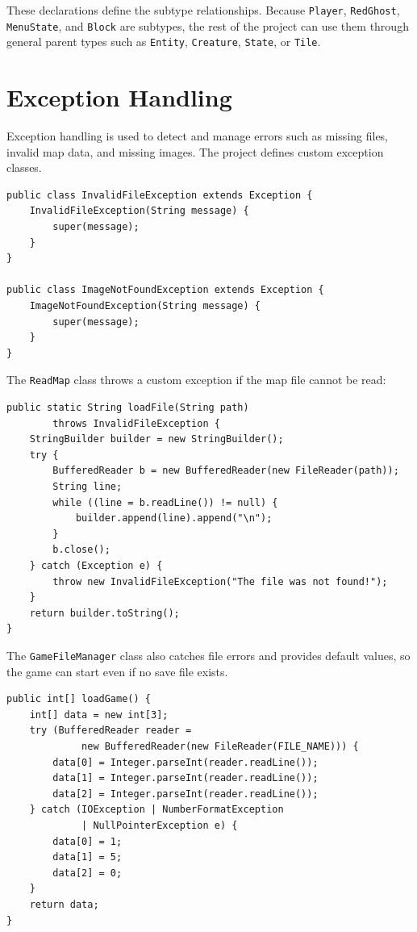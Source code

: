 \documentclass[12pt,a4paper]{article}
\begin{document}
These declarations define the subtype relationships. Because \texttt{Player}, \texttt{RedGhost}, \texttt{MenuState}, and \texttt{Block} are subtypes, the rest of the project can use them through general parent types such as \texttt{Entity}, \texttt{Creature}, \texttt{State}, or \texttt{Tile}.

\section{Exception Handling}

Exception handling is used to detect and manage errors such as missing files, invalid map data, and missing images. The project defines custom exception classes.

\begin{lstlisting}
public class InvalidFileException extends Exception {
    InvalidFileException(String message) {
        super(message);
    }
}

public class ImageNotFoundException extends Exception {
    ImageNotFoundException(String message) {
        super(message);
    }
}
\end{lstlisting}

The \texttt{ReadMap} class throws a custom exception if the map file cannot be read:

\begin{lstlisting}
public static String loadFile(String path)
        throws InvalidFileException {
    StringBuilder builder = new StringBuilder();
    try {
        BufferedReader b = new BufferedReader(new FileReader(path));
        String line;
        while ((line = b.readLine()) != null) {
            builder.append(line).append("\n");
        }
        b.close();
    } catch (Exception e) {
        throw new InvalidFileException("The file was not found!");
    }
    return builder.toString();
}
\end{lstlisting}

The \texttt{GameFileManager} class also catches file errors and provides default values, so the game can start even if no save file exists.

\begin{lstlisting}
public int[] loadGame() {
    int[] data = new int[3];
    try (BufferedReader reader =
             new BufferedReader(new FileReader(FILE_NAME))) {
        data[0] = Integer.parseInt(reader.readLine());
        data[1] = Integer.parseInt(reader.readLine());
        data[2] = Integer.parseInt(reader.readLine());
    } catch (IOException | NumberFormatException
             | NullPointerException e) {
        data[0] = 1;
        data[1] = 5;
        data[2] = 0;
    }
    return data;
}
\end{lstlisting}
\end{document}
